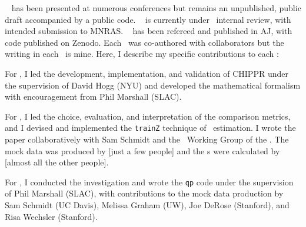 \chapname~ has been presented at numerous conferences but remains an unpublished, public draft accompanied by a public code.
\chapname~ is currently under \desc\ internal review, with intended submission to MNRAS.
\chapname~ has been refereed and published in AJ, with code published on Zenodo.
Each \chapname\ was co-authored with collaborators but the writing in each \chapname\ is mine.
Here, I describe my specific contributions to each \chapname:
\begin{enumerate}

{\item For , I led the development, implementation, and validation of CHIPPR under the supervision of David Hogg (NYU) and developed the mathematical formalism with encouragement from Phil Marshall (SLAC).}

{\item For , I led the choice, evaluation, and interpretation of the comparison metrics, and I devised and implemented the \texttt{trainZ} technique of \pzpdf\ estimation.
I wrote the paper collaboratively with Sam Schmidt and the \Pz\ Working Group of the \desc.
The mock data was produced by [just a few people] and the \pzpdf s were calculated by [almost all the other people].}

{\item For , I conducted the investigation and wrote the \texttt{qp} code under the supervision of Phil Marshall (SLAC), with contributions to the mock data production by Sam Schmidt (UC Davis), Melissa Graham (UW), Joe DeRose (Stanford), and Risa Wechsler (Stanford).}

\end{enumerate}

